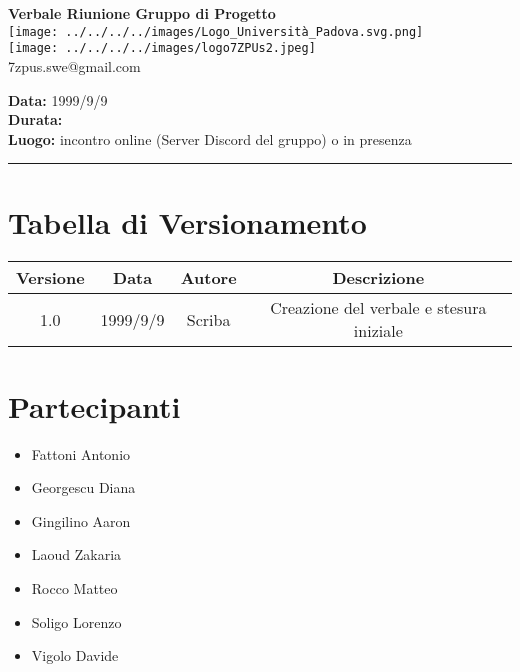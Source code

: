 \documentclass[a4paper,12pt]{article}
\begin{document}
\begin{center}
    \Large \textbf{Verbale Riunione Gruppo di Progetto}\\
    \vspace{0.5cm}
    \texttt{[image: ../../../../images/Logo\_Università\_Padova.svg.png]}\\
    \texttt{[image: ../../../../images/logo7ZPUs2.jpeg]}\\
    \small\hspace{10cm} 7zpus.swe@gmail.com
\end{center}

\noindent
\textbf{Data:} 1999/9/9 \\
\textbf{Durata:}  \\
\textbf{Luogo:} incontro online (Server Discord del gruppo) o in presenza

\vspace{0.3cm}
\hrule
\vspace{0.5cm}

\tableofcontents

\newpage

\section{Tabella di Versionamento}
    \begin{tabular}{|c|c|c|c|}
        \hline
        \textbf{Versione} & \textbf{Data} & \textbf{Autore} & \textbf{Descrizione} \\
        \hline
        1.0 & 1999/9/9 & Scriba & Creazione del verbale e stesura iniziale \\

        \hline
    \end{tabular}


\section{Partecipanti}
\begin{itemize}[noitemsep]
    \item Fattoni Antonio 
    \item Georgescu Diana
    \item Gingilino Aaron
    \item Laoud Zakaria
    \item Rocco Matteo
    \item Soligo Lorenzo
    \item Vigolo Davide
\end{itemize}
\end{document}

